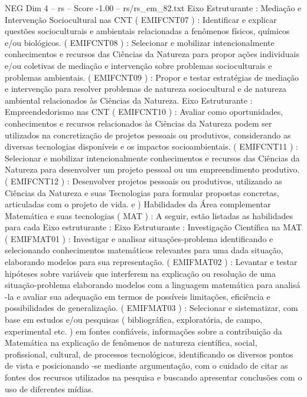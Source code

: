 \begin{textsample}{NEG Dim 4 – rs – Score -1.00 – rs/rs\_em\_82.txt}
Eixo Estruturante : Mediação e Intervenção Sociocultural nas CNT ( EMIFCNT07 ) : Identificar e explicar questões socioculturais e ambientais relacionadas a fenômenos físicos, químicos e/ou biológicos. ( EMIFCNT08 ) : Selecionar e mobilizar intencionalmente conhecimentos e recursos das Ciências da Natureza para propor ações individuais e/ou coletivas de mediação e intervenção sobre problemas socioculturais e problemas ambientais. ( EMIFCNT09 ) : Propor e testar estratégias de mediação e intervenção para resolver problemas de natureza sociocultural e de natureza ambiental relacionados às Ciências da Natureza.
Eixo Estruturante : Empreendedorismo nas CNT ( EMIFCNT10 ) : Avaliar como oportunidades, conhecimentos e recursos relacionados às Ciências da Natureza podem ser utilizados na concretização de projetos pessoais ou produtivos, considerando as diversas tecnologias disponíveis e os impactos socioambientais. ( EMIFCNT11 ) : Selecionar e mobilizar intencionalmente conhecimentos e recursos das Ciências da Natureza para desenvolver um projeto pessoal ou um empreendimento produtivo. ( EMIFCNT12 ) : Desenvolver projetos pessoais ou produtivos, utilizando as Ciências da Natureza e suas Tecnologias para formular propostas concretas, articuladas com o projeto de vida. e ) Habilidades da Área complementar Matemática e suas tecnologias ( MAT ) : A seguir, estão listadas as habilidades para cada Eixo estruturante : Eixo Estruturante : Investigação Científica na MAT ( EMIFMAT01 ) : Investigar e analisar situações-problema identificando e selecionando conhecimentos matemáticos relevantes para uma dada situação, elaborando modelos para sua representação. ( EMIFMAT02 ) : Levantar e testar hipóteses sobre variáveis que interferem na explicação ou resolução de uma situação-problema elaborando modelos com a linguagem matemática para analisá -la e avaliar sua adequação em termos de possíveis limitações, eficiência e possibilidades de generalização. ( EMIFMAT03 ) : Selecionar e sistematizar, com base em estudos e/ou pesquisas ( bibliográfica, exploratória, de campo, experimental etc. ) em fontes confiáveis, informações sobre a contribuição da Matemática na explicação de fenômenos de natureza científica, social, profissional, cultural, de processos tecnológicos, identificando os diversos pontos de vista e posicionando -se mediante argumentação, com o cuidado de citar as fontes dos recursos utilizados na pesquisa e buscando apresentar conclusões com o uso de diferentes mídias.

\end{textsample}
